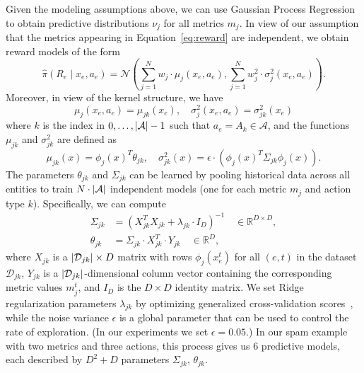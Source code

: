 Given the modeling assumptions above, we can use Gaussian Process Regression~\cite{williams1998prediction} to obtain predictive distributions $\nu_j$ for all metrics $m_j$. In view of our assumption that the metrics appearing in Equation~\eqref{eq:reward} are independent, we obtain reward models of the form
\begin{equation}\label{eq:model_structure}
	\hat \pi (R_e \mid x_e, a_e) = \mathcal{N}\left(\sum_{j=1}^N w_j\cdot \mu_{j}(x_{e},a_e),\sum_{j=1}^N w_j^2 \cdot \sigma_{j}^2(x_{e},a_e) \right).
\end{equation}
Moreover, in view of the kernel structure, we have
\begin{equation}
\label{eq:decoupling_actions}
	\mu_{j}(x_{e},a_e) = \mu_{jk}(x_e), \quad  \sigma_{j}^2(x_{e},a_e) = \sigma_{jk}^2(x_{e}) 
\end{equation}
\noindent where $k$ is the index in $0, \ldots, \left|\mathcal{A}\right|-1$ such that $a_e  = A_{k} \in \mathcal{A}$, and the functions $\mu_{jk}$ and $\sigma^2_{jk}$ are defined as
\begin{equation}\label{eq:inference}
\mu_{jk}(x) = \phi_j(x)^T \theta_{jk}, \quad \sigma_{jk}^2(x)  =  \epsilon  \cdot \left( \phi_j(x)^T  \Sigma_{jk} \phi_j(x) \right).
\end{equation}
The parameters $\theta_{jk}$ and $\Sigma_{jk}$ can be learned by pooling historical data across all entities to train $N \cdot \left|\mathcal{A}\right|$ independent models (one for each metric $m_j$ and action type $k$). Specifically, we can compute
\begin{align}
\label{eq:compute_sigma} \Sigma_{jk} & =  \left(X_{jk}^T X_{jk} + \lambda_{jk} \cdot I_D\right)^{-1} \quad  \in \mathbb{R}^{D \times D}, \\
\label{eq:compute_theta} \theta_{jk} & =  \Sigma_{jk} \cdot X_{jk}^T \cdot Y_{jk} \quad \in \mathbb{R}^D, 
\end{align}
where $X_{jk}$ is a $\left|\mathcal{D}_{jk}\right| \times D$ matrix with rows $\phi_j(x_e^t)$ for all $(e,t)$ in the dataset $\mathcal{D}_{jk}$, $Y_{jk}$ is a $\left|\mathcal{D}_{jk}\right|$-dimensional column vector containing the corresponding metric values $m_{j}^t$, and $I_D$ is the $D \times D$ identity matrix. We set Ridge regularization parameters $\lambda_{jk}$ by optimizing generalized cross-validation scores~\cite{golub1979generalized}, while the noise variance $\epsilon$ is a global parameter that can be used to control the rate of exploration. (In our experiments we set $\epsilon = 0.05$.) In our spam example with two metrics and three actions, this process gives us 6 predictive models, each described by $D^2+D$ parameters $\Sigma_{jk}$, $\theta_{jk}$.

